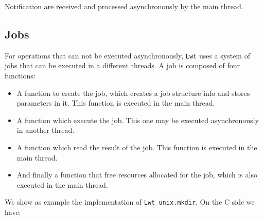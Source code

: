 Notification are received and processed asynchronously by the main thread.



\subsection{ Jobs }

For operations that can not be executed asynchronously, {\tt Lwt} uses a
system of jobs that can be executed in a different threads. A job is
composed of four functions:



\begin{itemize}
\item  A function to create the job, which creates a job structure info
and stores parameters in it. This function is executed in the
main thread.
\item  A function which execute the job. This one may be executed asynchronously
in another thread.
\item  A function which read the result of the job. This function is
executed in the main thread.
\item  And finally a function that free resources allocated for the
job, which is also executed in the main thread.

\end{itemize}

We show as example the implementation of {\tt Lwt\_unix.mkdir}. On the C
side we have:



